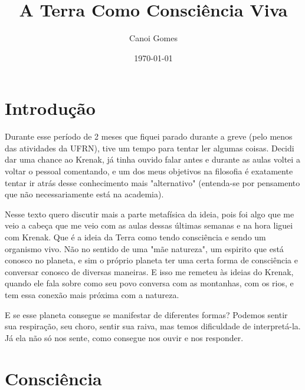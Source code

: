 \documentclass[a4paper,oneside,12pt]{article}
\title{A Terra Como Consciência Viva}
\author{Canoi Gomes}
\date{\today}
\begin{document}
\maketitle
\newpage

\tableofcontents
\newpage

\section{Introdução}

Durante esse período de 2 meses que fiquei parado durante a greve (pelo menos das atividades da UFRN),
tive um tempo para tentar ler algumas coisas.
Decidi dar uma chance ao Krenak, já tinha ouvido falar antes e durante as aulas voltei a voltar o pessoal comentando, e um dos meus objetivos na filosofia é exatamente tentar ir atrás desse conhecimento mais "alternativo" (entenda-se por pensamento que não necessariamente está na academia).

Nesse texto quero discutir mais a parte metafísica da ideia, pois foi algo que me veio a cabeça que me veio com as aulas dessas últimas semanas e na hora liguei com Krenak. Que é a ideia da Terra como tendo consciência e sendo um organismo vivo. Não no sentido de uma "mãe natureza", um espirito que está conosco no planeta, e sim o próprio planeta ter uma certa forma de consciência e conversar conosco de diversas maneiras. E isso me remeteu às ideias do Krenak, quando ele fala sobre como seu povo conversa com as montanhas, com os rios, e tem essa conexão mais próxima com a natureza.

E se esse planeta consegue se manifestar de diferentes formas? Podemos sentir sua respiração, seu choro, sentir sua raiva, mas temos dificuldade de interpretá-la. Já ela não só nos sente, como consegue nos ouvir e nos responder.

\section{Consciência}
\end{document}
